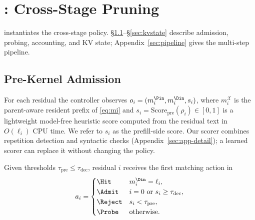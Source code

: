 \section{\sys: Cross-Stage Pruning}
\label{sec:design}

 instantiates the cross-stage policy.
\S\ref{sec:app}--\S\ref{sec:kvstate} describe admission, probing, accounting, and KV state; Appendix~\ref{sec:pipeline} gives the multi-step pipeline.

\subsection{Pre-Kernel Admission}
\label{sec:app}

For each residual the controller observes $o_i=(m_i^{\Pin},m_i^{\Din},s_i)$, where $m_i^{\mathcal{X}}$ is the parent-aware resident prefix of \eqref{eq:mi} and $s_i=\mathrm{Score}_{\mathrm{pre}}(\rho_i)\in[0,1]$ is a lightweight model-free heuristic score computed from the residual text in $O(\ell_i)$ CPU time.
We refer to $s_i$ as the prefill-side score.
Our scorer combines repetition detection and syntactic checks (Appendix~\ref{sec:app-detail}); a learned scorer can replace it without changing the policy.

\begin{definition}
\label{def:action}
Given thresholds $\tau_{\mathrm{pre}}\le\tau_{\mathrm{dec}}$, residual $i$ receives the first matching action in
\begin{equation}
\label{eq:action}
a_i=
\begin{cases}
\Hit & m_i^{\Din}=\ell_i,\\
\Admit & i=0\ \text{or}\ s_i\ge\tau_{\mathrm{dec}},\\
\Reject & s_i<\tau_{\mathrm{pre}},\\
\Probe & \text{otherwise}.
\end{cases}
\end{equation}
\end{definition}

